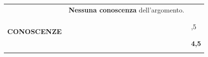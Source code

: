 \renewcommand{\arraystretch}{1}
\begin{tabularx}{\textwidth}{|c|>{\arraybackslash}m{11.8cm}|>{\left\arraybackslash}m{0.8cm}|}

\multirow{7}{*}{\parbox{3.3cm}{ \textbf{\vspace{0.5cm}\\CONOSCENZE} \vspace{0.5cm}\\ \fontsize{9}{2}\selectfont{Conoscenza di\\ principi teorie,\\concetti, termini,\\regole, procedure,\\metodi e tecniche.}}}
& \fontsize{9}{2}\selectfont\textbf{{Nessuna} conoscenza}  dell’argomento. & 0 \\
\cline{2-3}
& \fontsize{9}{2}\selectfont{\textbf{Importanti lacune} nelle conoscenze.} & 1 \\
\cline{2-3}
& \fontsize{9}{2}\selectfont{Conoscenze \textbf{frammentarie e/o superficiali}.} & 2 \\
\cline{2-3}
& \fontsize{8.5}{2}\selectfont{Conoscenza della \textbf{maggior parte} degli argomenti teorici sebbene \textbf{con qualche incertezza}.} & 2,5 \\
\cline{2-3}
& \fontsize{9}{2}\selectfont{Conoscenza degli aspetti teorici \textbf{principali}.} & 3 \\
\cline{2-3}
& \fontsize{8}{2}\selectfont{Conoscenza \textbf{completa} degli aspetti teorici con \textbf{lievi incertezze} su conoscenze \textbf{non fondamentali}.} & 4 \\
\cline{2-3}
& \fontsize{9}{2}\selectfont{Conoscenze \textbf{esaurienti su tutti} gli aspetti teorici.} & \textbf{4,5} \\
\Xhline{2pt}


\end{tabularx}
